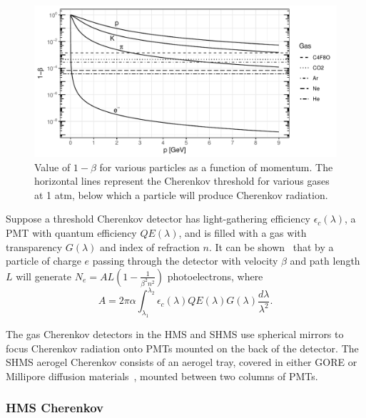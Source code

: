 \begin{figure}[!h]
    \centering
    \includegraphics[width=1.0\textwidth]{chap3/cer_gas_thresholds.pdf}
    \caption{Value of $1-\beta$ for various particles as a function of
            momentum. The horizontal lines represent the Cherenkov threshold
            for various gases at 1 atm, below which a particle
            will produce Cherenkov radiation.
            }
    \label{fig:cer_gas_threshold}
\end{figure}

Suppose a threshold Cherenkov detector has
light-gathering efficiency $\epsilon_c(\lambda)$,
a PMT with quantum efficiency $QE(\lambda)$,
and is filled with a gas with transparency $G(\lambda)$
and index of refraction $n$.
It can be shown~\cite{NGC_Design_Report} that by a particle of charge $e$ passing through the detector
with velocity $\beta$ and path length $L$ will generate
$N_e =AL\left(1-\frac{1}{\beta^2n^2}\right)$ photoelectrons, where
\begin{equation}
A = 2 \pi \alpha \int_{\lambda_1}^{\lambda_2} \epsilon_c(\lambda)QE(\lambda)G(\lambda)\frac{d\lambda}{\lambda^2}.
\end{equation}

The gas Cherenkov detectors in the HMS and SHMS use spherical mirrors to focus
Cherenkov radiation onto PMTs mounted on the back of the detector. The SHMS
aerogel Cherenkov consists of an aerogel tray, covered in either GORE or
Millipore diffusion materials~\cite{Horn_2017}, mounted between two columns
of PMTs.

\subsubsection{HMS Cherenkov}

